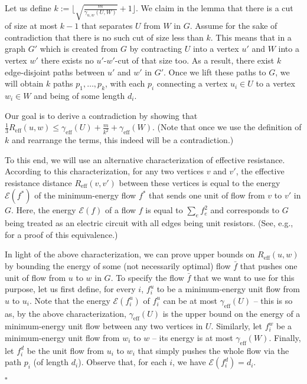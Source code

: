 \documentclass[11pt, letterpaper]{article}
\newenvironment{proof}{\noindent{\bf Proof:}\hspace*{1em}}{\qed\bigskip}
\newcommand{\qed}{\hfill\ensuremath{\square}}
\newcommand{\Reff}{R_{\mathrm{eff}}}
\newcommand{\diameff}{\gamma_{\mathrm{eff}}}
\newcommand{\energy}{\mathcal{E}}
\newcommand{\of}{\bar{f}}
\begin{document}
\begin{proof}
Let us define $k:=\lfloor\sqrt{\frac{m}{\gamma_{u,w}(U,W)}}+1\rfloor$. We claim in the lemma that there is a cut of size at most $k-1$ that separates $U$ from $W$ in $G$. Assume for the sake of contradiction that there is no such cut of size less than $k$. This means that in a graph $G'$ which is created from $G$ by contracting $U$ into a vertex $u'$ and $W$ into a vertex $w'$ there exists no $u'$-$w'$-cut of that size too. As a result, there exist $k$ edge-disjoint paths between $u'$ and $w'$ in $G'$. Once we lift these paths to $G$, we will obtain $k$ paths $p_1,\ldots, p_k$, with each $p_i$ connecting a vertex $u_i \in U$ to a vertex $w_i \in W$ and being of some length $d_i$.

Our goal is to derive a contradiction by showing that $\frac{1}{3}\Reff(u,w)\leq \diameff(U) + \frac{m}{k^2} + \diameff(W)$. (Note that once we use the definition of $k$ and rearrange the terms, this indeed will be a contradiction.) 

To this end, we will use an alternative characterization of effective resistance. According to this characterization, for any two vertices $v$ and $v'$, the effective resistance distance $\Reff(v,v')$ between these vertices is equal to the energy $\energy(f^*)$ of the minimum-energy flow $f^*$ that sends one unit of flow from $v$ to $v'$ in $G$. Here, the energy $\energy(f)$ of a flow $f$ is equal to $\sum_{e} f_e^2$ and corresponds to $G$ being treated as an electric circuit with all edges being unit resistors. (See, e.g., \cite{LyonsP13,Bollobas98} for a proof of this equivalence.)

In light of the above characterization, we can prove upper bounds on $\Reff(u,w)$ by bounding the energy of some (not necessarily optimal) flow $\of$ that pushes one unit of flow from $u$ to $w$ in $G$. To specify the flow $\of$ that we want to use for this purpose, let us first define, for every $i$, $f_i^u$ to be a minimum-energy unit flow from $u$ to $u_i$. Note that the energy $\energy(f_i^u)$ of $f_i^u$ can be at most $\diameff(U)$ -- this is so as, by the above characterization, $\diameff(U)$ is the upper bound on the energy of a minimum-energy unit flow between any two vertices in $U$. Similarly, let $f_i^w$ be a minimum-energy unit flow from $w_i$ to $w$ -- its energy is at most $\diameff(W)$. Finally, let $f_i^d$ be the unit flow from $u_i$ to $w_i$ that simply pushes the whole flow via the path $p_i$ (of length $d_i$). Observe that, for each $i$, we have $\energy(f_i^d)=d_i$. 


\end{proof}
\end{document}
